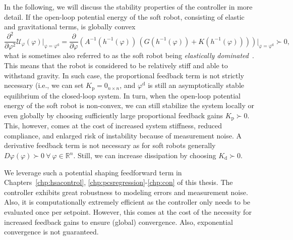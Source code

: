 In the following, we will discuss the stability properties of the controller in more detail.
If the open-loop potential energy of the soft robot, consisting of elastic and gravitational terms, is globally convex
\begin{equation}
    \frac{\partial^2}{\partial \varphi^2} \mathcal{U}_{\varphi}(\varphi) \bigg |_\mathrm{\varphi = \varphi^\mathrm{d}} = \frac{\partial}{\partial \varphi} \left (  A^{-1}(h^{-1}(\varphi)) \,  \left ( G(h^{-1}(\varphi)) + K(h^{-1}(\varphi)) \right ) \right ) \bigg |_\mathrm{\varphi = \varphi^\mathrm{d}} \succ 0, 
\end{equation}
what is sometimes also referred to as the soft robot being \emph{elastically dominated}~\citep{borja2022energy, della2023model, pustina2025analysis}. This means that the robot is considered to be relatively stiff and able to withstand gravity. In such case, the proportional feedback term is not strictly necessary (i.e., we can set $K_\mathrm{p} = 0_{n \times n}$, and $\varphi^\mathrm{d}$ is still an asymptotically stable equilibrium of the closed-loop system.
In turn, when the open-loop potential energy of the soft robot is non-convex, we can still stabilize the system locally or even globally by choosing sufficiently large proportional feedback gains $K_\mathrm{p} \succ 0$.
This, however, comes at the cost of increased system stiffness, reduced compliance, and enlarged risk of instability because of measurement noise.
A derivative feedback term is not necessary as for soft robots generally $D\varphi(\varphi) \succ 0 \: \forall \: \varphi \in \mathbb{R}^n$. Still, we can increase dissipation by choosing $K_\mathrm{d} \succ 0$.

We leverage such a potential shaping feedforward term in Chapters~\ref{chp:hsacontrol}, \ref{chp:pcsregression}-\ref{chp:con} of this thesis.
The controller exhibits great robustness to modeling errors and measurement noise.
Also, it is computationally extremely efficient as the controller only needs to be evaluated once per setpoint.
However, this comes at the cost of the necessity for increased feedback gains to ensure (global) convergence. Also, exponential convergence is not guaranteed.



